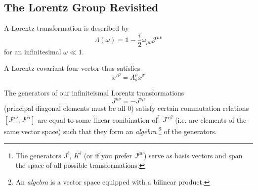 \documentclass[11pt]{article}
\author{}
\title{}
\date{}
\begin{document}
	
	\pagestyle{fancy}
	\maketitle
	
	\vspace{-8em}
	
	
	\noindent
	
	\vspace{11pt}
	

	\subsection*{The Lorentz Group Revisited}
	
		A Lorentz transformation is described by \[ \Lambda(\omega) = \mathbb{1} - \frac{i}{2}\omega_{\mu\nu} \mathcal{J}^{\mu\nu}\] for an infinitesimal $\omega \ll 1$.
		
		
		A Lorentz covariant four-vector thus satisfies \[ x'^{\rho} = \Lambda^\rho_\sigma x^\sigma\] 
		
		The generators of our infiniteismal Lorentz transformations \[ J^{\mu\nu} = -J^{\nu\mu}\] (principal diagonal elements must be all $0$) satisfy certain commutation relations \\
		
		$[ J^{\mu\nu} , J^{\rho\sigma} ]$ are equal to some linear combination of\footnote{The generators $J^i$, $K^i$ (or if you prefer $J^{\mu\nu}$) serve as basis vectors and span the space of all possible transformations.} $J^{\alpha\beta}$ (i.e. are elements of the same vector space) such that they form an \textit{algebra} \footnote{An {\it algebra} is a vector space equipped with a bilinear product.} of the generators.\\ 
	
\end{document}
